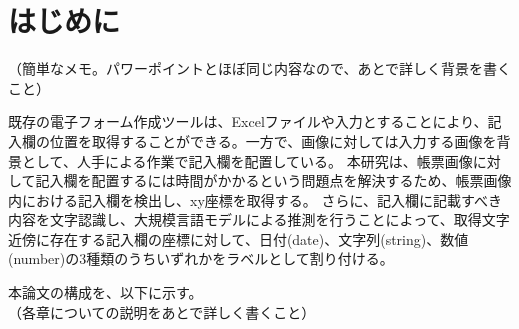 \chapter{はじめに}\label{cha:Introduction}
（簡単なメモ。パワーポイントとほぼ同じ内容なので、あとで詳しく背景を書くこと）

既存の電子フォーム作成ツールは、Excelファイルや入力とすることにより、記入欄の位置を取得することができる。一方で、画像に対しては入力する画像を背景として、人手による作業で記入欄を配置している。
本研究は、帳票画像に対して記入欄を配置するには時間がかかるという問題点を解決するため、帳票画像内における記入欄を検出し、xy座標を取得する。
さらに、記入欄に記載すべき内容を文字認識し、大規模言語モデルによる推測を行うことによって、取得文字近傍に存在する記入欄の座標に対して、日付(date)、文字列(string)、数値(number)の3種類のうちいずれかをラベルとして割り付ける。

本論文の構成を、以下に示す。\\
  （各章についての説明をあとで詳しく書くこと）
